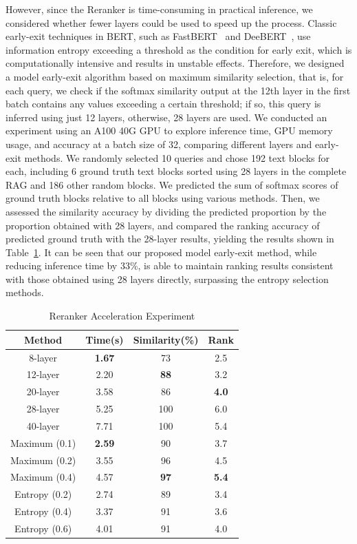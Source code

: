 \documentclass[11pt]{article}
\begin{document}
However, since the Reranker is time-consuming in practical inference, we considered whether fewer layers could be used to speed up the process. Classic early-exit techniques in BERT, such as FastBERT~\cite{liu-etal-2020-fastbert} and DeeBERT~\cite{xin-etal-2020-deebert}, use information entropy exceeding a threshold as the condition for early exit, which is computationally intensive and results in unstable effects. Therefore, we designed a model early-exit algorithm based on maximum similarity selection, that is, for each query, we check if the softmax similarity output at the 12th layer in the first batch contains any values exceeding a certain threshold; if so, this query is inferred using just 12 layers, otherwise, 28 layers are used. We conducted an experiment using an A100 40G GPU to explore inference time, GPU memory usage, and accuracy at a batch size of 32, comparing different layers and early-exit methods. We randomly selected 10 queries and chose 192 text blocks for each, including 6 ground truth text blocks sorted using 28 layers in the complete RAG and 186 other random blocks. We predicted the sum of softmax scores of ground truth blocks relative to all blocks using various methods. Then, we assessed the similarity accuracy by dividing the predicted proportion by the proportion obtained with 28 layers, and compared the ranking accuracy of predicted ground truth with the 28-layer results, yielding the results shown in Table~\ref{tab:reranker}. It can be seen that our proposed model early-exit method, while reducing inference time by 33\%, is able to maintain ranking results consistent with those obtained using 28 layers directly, surpassing the entropy selection methods.

\begin{table}[htp]
\setlength{\tabcolsep}{1pt}
\centering
\begin{tabular}{cccc}
\toprule
 \textbf{Method} & \textbf{Time(s)} & \textbf{Similarity(\%)} & \textbf{Rank} \\
\midrule
8-layer & \textbf{1.67} & 73 & 2.5 \\
12-layer & 2.20 & \textbf{88} & 3.2 \\
20-layer & 3.58 & 86 & \textbf{4.0} \\
\midrule
28-layer & 5.25 & 100 & 6.0  \\
40-layer & 7.71 & 100 & 5.4 \\
\midrule
Maximum (0.1) & \textbf{2.59} & 90 & 3.7 \\
Maximum (0.2) & 3.55 & 96 & 4.5 \\
Maximum (0.4) & 4.57 & \textbf{97} & \textbf{5.4} \\
Entropy (0.2) & 2.74 & 89 & 3.4 \\
Entropy (0.4) & 3.37 & 91 & 3.6 \\
Entropy (0.6) & 4.01 & 91 & 4.0 \\
\bottomrule
\end{tabular}
\caption{Reranker Acceleration Experiment}
 \label{tab:reranker}
\end{table}
\end{document}
